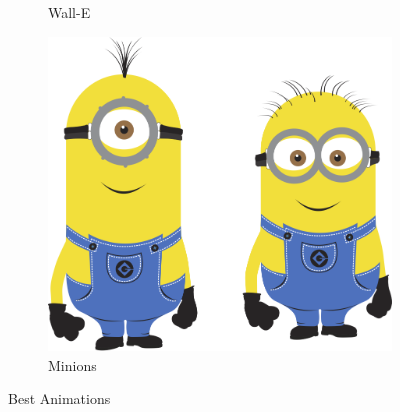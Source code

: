 \begin{landscape}
\begin{figure}
\begin{subfigure}[b]{0.3\textwidth}
    \caption{Wall-E}
    \label{fig:WallE}
  \end{subfigure}             
  \begin{subfigure}[b]{0.3\textwidth}
    \includegraphics[width=\textwidth]{minion}
    \caption{Minions}
    \label{fig:Minnion}
  \end{subfigure}
  \caption{Best Animations}
  \label{fig:animations}
\end{figure}


\end{landscape}
